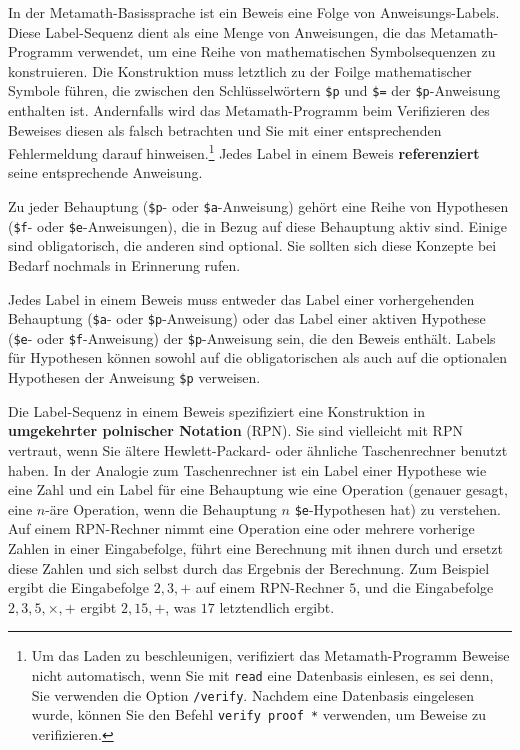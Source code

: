 In der Metamath-Basissprache ist ein Beweis eine Folge von Anweisungs-Labels.  Diese Label-Sequenz dient als eine Menge von Anweisungen, die das Metamath-Programm verwendet, um eine Reihe von mathematischen Symbolsequenzen zu konstruieren.  Die Konstruktion muss letztlich zu der Foilge mathematischer Symbole führen, die zwischen den Schlüsselwörtern \texttt{\$p} und \texttt{\$=} der \texttt{\$p}-Anweisung enthalten ist.  Andernfalls wird das Metamath-Programm beim Verifizieren des Beweises diesen als falsch betrachten und Sie mit einer entsprechenden Fehlermeldung darauf hinweisen.\footnote{Um das Laden zu beschleunigen, verifiziert das Metamath-Programm Beweise nicht automatisch, wenn Sie mit \texttt{read} eine Datenbasis einlesen, es sei denn, Sie verwenden die Option \texttt{/verify}.  Nachdem eine Datenbasis eingelesen wurde, können Sie den Befehl \texttt{verify proof *} verwenden, um Beweise zu verifizieren.} Jedes Label in einem Beweis {\bf referenziert} seine entsprechende Anweisung.

Zu jeder Behauptung  (\texttt{\$p}- oder \texttt{\$a}-Anweisung) gehört eine Reihe von Hypothesen (\texttt{\$f}- oder \texttt{\$e}-Anweisungen), die in Bezug auf diese Behauptung aktiv sind.  Einige sind obligatorisch, die anderen sind optional.  Sie sollten sich diese Konzepte bei Bedarf nochmals in Erinnerung rufen.

Jedes Label in einem Beweis muss entweder das Label einer vorhergehenden Behauptung (\texttt{\$a}- oder \texttt{\$p}-Anweisung) oder das Label einer aktiven Hypothese (\texttt{\$e}- oder \texttt{\$f}-Anweisung) der \texttt{\$p}-Anweisung sein, die den Beweis enthält.  Labels für Hypothesen können sowohl auf die obligatorischen als auch auf die optionalen Hypothesen der Anweisung \texttt{\$p} verweisen.

Die Label-Sequenz in einem Beweis spezifiziert eine Konstruktion in {\bf umgekehrter polnischer Notation} (RPN).  Sie sind vielleicht mit RPN vertraut, wenn Sie ältere Hewlett-Packard- oder ähnliche Taschenrechner benutzt haben. In der Analogie zum Taschenrechner ist ein Label einer Hypothese wie eine Zahl und ein Label für eine Behauptung wie eine Operation (genauer gesagt, eine $n$-äre Operation, wenn die Behauptung $n$ \texttt{\$e}-Hypothesen hat) zu verstehen. Auf einem RPN-Rechner nimmt eine Operation eine oder mehrere vorherige Zahlen in einer Eingabefolge, führt eine Berechnung mit ihnen durch und ersetzt diese Zahlen und sich selbst durch das Ergebnis der Berechnung.  Zum Beispiel ergibt die Eingabefolge $2,3,+$ auf einem RPN-Rechner $5$, und die Eingabefolge $2,3,5,{\times},+$ ergibt $2,15,+$, was $17$ letztendlich ergibt.

